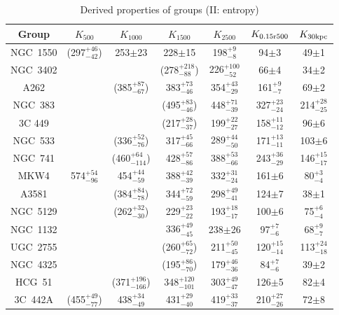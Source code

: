 \documentclass{aastex}
\begin{document}
\begin{table}
\begin{center}
\caption{Derived properties of groups (II: entropy)}
{\scriptsize
\begin{tabular}{ccccccc} \hline \hline
Group & $K_{500}$\tablenotemark{a} & $K_{1000}$\tablenotemark{a} & $K_{1500}$\tablenotemark{a} & $K_{2500}$ & $K_{\rm 0.15 r500}$ & $K_{\rm 30 kpc}$ \\ \hline

NGC~1550 & (297$^{+46}_{-42}$) & 253$\pm$23 & 228$\pm$15 & 198$^{+9}_{-8}$ & 94$\pm$3 & 49$\pm$1 \\
NGC~3402 & & & (278$^{+218}_{-88}$) & 226$^{+100}_{-52}$ & 66$\pm$4 & 34$\pm$2 \\
A262 & & (385$^{+87}_{-67}$) & 383$^{+73}_{-46}$ & 354$^{+43}_{-29}$ & 161$^{+9}_{-7}$ & 69$\pm$2 \\
NGC~383 & & & (495$^{+83}_{-46}$) & 448$^{+71}_{-39}$ & 327$^{+23}_{-24}$ & 214$^{+28}_{-25}$ \\
3C 449 & & & (217$^{+28}_{-37}$) & 199$^{+22}_{-27}$ & 158$^{+11}_{-12}$ & 96$\pm$6 \\
NGC~533 & & (336$^{+52}_{-76}$) & 317$^{+45}_{-66}$ & 289$^{+44}_{-50}$ & 171$^{+13}_{-11}$ & 103$\pm$6 \\
NGC~741 & & (460$^{+64}_{-114}$) & 428$^{+57}_{-86}$ & 388$^{+53}_{-66}$ & 243$^{+36}_{-29}$ & 146$^{+15}_{-17}$ \\
MKW4 & 574$^{+54}_{-96}$ & 454$^{+44}_{-59}$ & 388$^{+42}_{-39}$ & 332$^{+31}_{-24}$ & 161$\pm$6 & 80$^{+3}_{-4}$ \\
A3581 & & (384$^{+84}_{-78}$) & 344$^{+72}_{-59}$ & 298$^{+49}_{-41}$ & 124$\pm$7 & 38$\pm$1 \\
NGC~5129 & & (262$^{+32}_{-30}$) & 229$^{+23}_{-22}$ & 193$^{+18}_{-17}$ & 100$\pm$6 & 75$^{+6}_{-4}$ \\
NGC~1132 & & & 336$^{+49}_{-45}$ & 238$\pm$26 & 97$^{+7}_{-6}$ & 68$^{+9}_{-7}$ \\
UGC~2755 & & & (260$^{+65}_{-72}$) & 211$^{+50}_{-45}$ & 120$^{+15}_{-14}$ & 113$^{+24}_{-18}$ \\
NGC~4325 & & & (195$^{+86}_{-70}$) & 179$^{+46}_{-36}$ & 84$^{+7}_{-6}$ & 39$\pm$2 \\
HCG~51 & & (371$^{+196}_{-166}$) & 348$^{+120}_{-101}$ & 303$^{+49}_{-47}$ & 126$\pm$5 & 82$\pm$4 \\
3C~442A & (455$^{+49}_{-77}$) & 438$^{+34}_{-49}$ & 431$^{+29}_{-40}$ & 419$^{+33}_{-37}$ & 210$^{+27}_{-26}$ & 72$\pm$8 \\

\end{tabular}}
\end{center}
\end{table}
\end{document}
